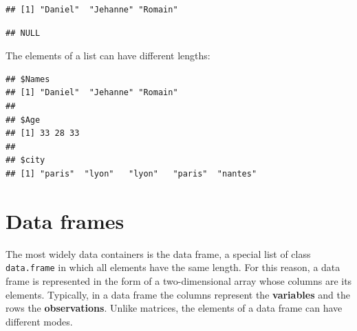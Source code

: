 \documentclass[]{book}
\newenvironment{Shaded}{\begin{snugshade}}{\end{snugshade}}
\newcommand{\KeywordTok}[1]{\textcolor[rgb]{0.13,0.29,0.53}{\textbf{#1}}}
\newcommand{\NormalTok}[1]{#1}
\newcommand{\OperatorTok}[1]{\textcolor[rgb]{0.81,0.36,0.00}{\textbf{#1}}}
\newcommand{\StringTok}[1]{\textcolor[rgb]{0.31,0.60,0.02}{#1}}
\begin{document}
\begin{verbatim}
## [1] "Daniel"  "Jehanne" "Romain"
\end{verbatim}

\begin{Shaded}
\end{Shaded}

\begin{verbatim}
## NULL
\end{verbatim}

The elements of a list can have different lengths:

\begin{Shaded}
\end{Shaded}

\begin{verbatim}
## $Names
## [1] "Daniel"  "Jehanne" "Romain" 
## 
## $Age
## [1] 33 28 33
## 
## $city
## [1] "paris"  "lyon"   "lyon"   "paris"  "nantes"
\end{verbatim}

\hypertarget{data-frames}{%
\section{Data frames}\label{data-frames}}

The most widely data containers is the data frame, a special list of class \texttt{data.frame} in which all elements have the same length. For this reason, a data frame is represented in the form of a two-dimensional array whose columns are its elements. Typically, in a data frame the columns represent the \textbf{variables} and the rows the \textbf{observations}. Unlike matrices, the elements of a data frame can have different modes.
\end{document}
